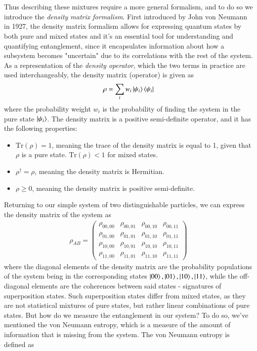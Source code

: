 \documentclass{subfiles}
\begin{document}
\\ \\ 
Thus describing these mixtures require a more general formalism, and to do so we introduce the \emph{density matrix formalism}. First introduced by John von Neumann in 1927\cite{neumann1927}, the density matrix formalism allows for expressing quantum states by both pure and mixed states and it's an essential tool for understanding and quantifying entanglement, since it encapsulates information about how a subsystem becomes "uncertain" due to its correlations with the rest of the system. As a representation of the \emph{density operator}, which the two terms in practice are used interchangeably, the density matrix (operator) is given as
\begin{equation}
    \rho = \sum_i w_i\ket{\psi_i}\bra{\psi_i}\label{eq:density_matrix}
\end{equation}
where the probability weight $w_i$ is the probability of finding the system in the pure state $\ket{\psi_i}$. The density matrix is a positive semi-definite operator, and it has the following properties:
\begin{itemize}
    \item $\text{Tr}(\rho) = 1$, meaning the trace of the density matrix is equal to 1, given that $\rho$ is a pure state. $\text{Tr}(\rho) < 1$ for mixed states.
    \item $\rho^\dagger = \rho$, meaning the density matrix is Hermitian.
    \item $\rho \geq 0$, meaning the density matrix is positive semi-definite.
\end{itemize}
Returning to our simple system of two distinguishable particles, we can express the density matrix of the system as
\begin{align*}
    \rho_{AB} = \begin{pmatrix}
        \rho_{00, 00} & \rho_{00, 01} & \rho_{00, 10} & \rho_{00, 11} \\
        \rho_{01, 00} & \rho_{01, 01} & \rho_{01, 10} & \rho_{01, 11} \\
        \rho_{10, 00} & \rho_{10, 01} & \rho_{10, 10} & \rho_{10, 11} \\
        \rho_{11, 00} & \rho_{11, 01} & \rho_{11, 10} & \rho_{11, 11}
    \end{pmatrix}
\end{align*}
where the diagonal elements of the density matrix are the probability populations of the system being in the corresponding states $\ket{00}, \ket{01}, \ket{10}, \ket{11}$, while the off-diagonal elements are the coherences between said states - signatures of superposition states. Such superposition states differ from mixed states, as they are not statistical mixtures of pure states, but rather linear combinations of pure states. But how do we measure the entanglement in our system? To do so, we've mentioned the von Neumann entropy, which is a measure of the amount of information that is missing from the system. The von Neumann entropy is defined as
\end{document}
